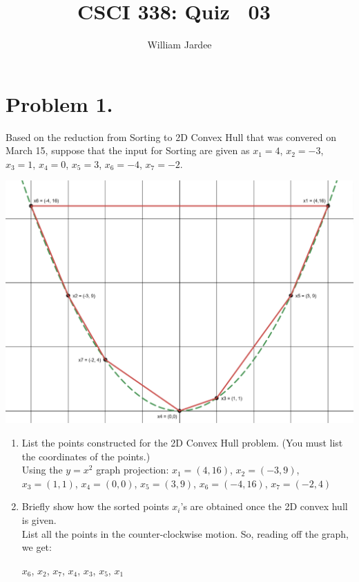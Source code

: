 \documentclass[11pt]{article}
\title{CSCI 338: Quiz ~03~}
\author{William Jardee}
\date{}
\begin{document}
\maketitle

\section*{Problem 1.}

    Based on the reduction from Sorting to 2D Convex Hull that was convered on March 15, suppose that the input for Sorting are given as $x_1 = 4$, $x_2 = -3$, $x_3=1$, $x_4=0$, $x_5 = 3$, $x_6 = -4$, $x_7 = -2$.
    
    \begin{center}
        \includegraphics[width = 0.95\linewidth]{images/convexhull.PNG}
    \end{center}
    
    \begin{enumerate}
        \item List the points constructed for the 2D Convex Hull problem. (You must list the coordinates of the points.)\\
        
            Using the $y=x^2$ graph projection: $x_1 = (4, 16)$, $x_2 = (-3, 9)$, $x_3=(1,1)$, $x_4=(0,0)$, $x_5 = (3, 9)$, $x_6 = (-4, 16)$, $x_7 = (-2,4)$
        
        \item Briefly show how the sorted points $x_i$'s are obtained once the 2D convex hull is given.\\
        
            List all the points in the counter-clockwise motion. So, reading off the graph, we get:
            \begin{center}
                $x_6$, $x_2$, $x_7$, $x_4$, $x_3$, $x_5$, $x_1$
            \end{center}
        
        
    \end{enumerate}
\end{document}
